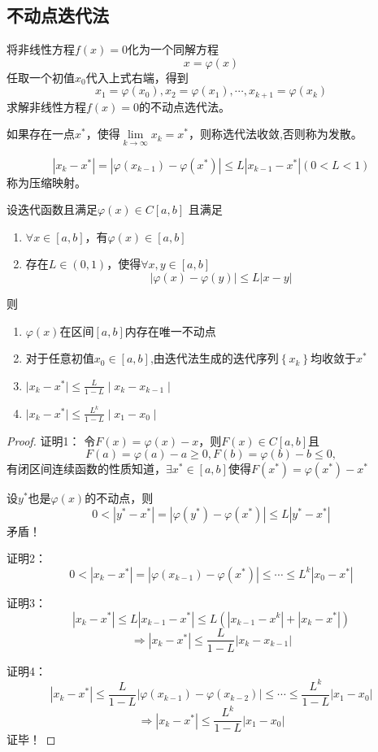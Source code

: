 \subsection{不动点迭代法}
\begin{definition}[不动点迭代法]
    将非线性方程$f(x) = 0$化为一个同解方程
    \[
        x = \varphi(x)
    \]
    任取一个初值$x_0$代入上式右端，得到
    \[
        x_1 = \varphi(x_0),x_2 = \varphi(x_1),\cdots,x_{k+1} = \varphi(x_k)
    \]
    求解非线性方程$f(x)= 0$的不动点选代法。

    如果存在一点$x^*$，使得$\lim\limits_{k\to \infty}x_k= x^*$，则称选代法收敛,否则称为发散。
\end{definition}
\begin{definition}[压缩映射]
    \[
        |x_{k}-x^*| = |\varphi(x_{k-1})-\varphi(x^*)|\leqslant L|x_{k-1}-x^*|(0<L<1)
    \]
    称为压缩映射。
\end{definition}
\begin{theorem}
    设迭代函数且满足$\varphi(x)\in C[a,b]$
    且满足
    \begin{enumerate}
        \item $\forall x\in[a,b]$，有$\varphi(x)\in[a,b]$
        \item 存在$L\in (0,1)$，使得$\forall x,y \in[a,b]$
        \[
            |\varphi(x)-\varphi(y)|\leqslant L|x-y|
        \]
    \end{enumerate}
    则
    \begin{enumerate}
        \item $\varphi(x)$在区间$[a,b]$内存在唯一不动点
        \item 对于任意初值$x_0\in [a,b]$,由迭代法生成的迭代序列$\left\{ x_k \right\}$均收敛于$x^*$
        \item $\mid x_{k}-x^{*}\mid\leq\frac{L}{1-L}\mid x_{k}-x_{k-1}\mid$
        \item $\mid x_{k}-x^{*}\mid\leq\frac{L^{k}}{1-L}\mid x_{1}-x_{0}\mid$
    \end{enumerate}
\end{theorem}
\begin{proof}
    证明1：
    令$F(x) = \varphi(x)-x$，则$F(x)\in C[a,b]$且
    \[
        F(a) = \varphi(a)-a\geqslant 0,F(b) = \varphi(b)-b\leqslant 0,
    \]
    有闭区间连续函数的性质知道，$\exists x^*\in [a,b]$使得$F(x^*) =\varphi(x^*)-x^*$

    设$y^*$也是$\varphi(x)$的不动点，则
    \[
        0<|y^*-x^*| = |\varphi(y^*)-\varphi(x^*)|\leqslant L|y^*-x^*|
    \]矛盾！

    证明2：
    \[
        0<|x_k-x^*| = |\varphi(x_{k-1})-\varphi(x^{*})|\leqslant\cdots\leqslant L^k|x_0-x^*|
    \]

    证明3：
    \[
        |x_k-x^*|\leqslant L|x_{k-1}-x^*|\leqslant L\left( |x_{k-1}-x^k| + |x_{k}-x^*| \right)
    \]
    \[
        \Rightarrow |x_k-x^*|\leqslant \dfrac{L}{1-L}|x_k-x_{k-1}|
    \]

    证明4：
    \[
        |x_k-x^*|\leqslant \dfrac{L}{1-L}|\varphi(x_{k-1})-\varphi(x_{k-2})|\leqslant \cdots \leqslant \dfrac{L^k}{1-L}|x_1-x_0|
    \]
    \[
        \Rightarrow |x_k-x^*|\leqslant \dfrac{L^k}{1-L}|x_1-x_0|
    \]
    证毕！
\end{proof}
